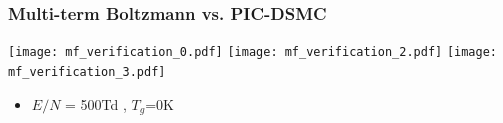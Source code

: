 \documentclass[mathserif, aspectratio=169]{beamer}
\begin{document}
\begin{frame}
	\frametitle{Multi-term Boltzmann vs. PIC-DSMC}
	\vspace{-0.25in}
	\begin{center}
		\texttt{[image: mf\_verification\_0.pdf]}
		\texttt{[image: mf\_verification\_2.pdf]}
		\texttt{[image: mf\_verification\_3.pdf]}
	\end{center}
	\begin{itemize}
		\item $E/N$ = 500Td , $T_g$=0K
	\end{itemize}
\end{frame}



\end{document}
